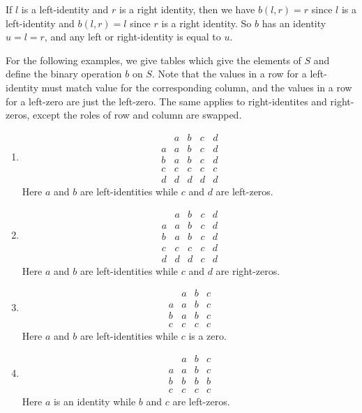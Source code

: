 \begin{solution}
If $l$ is a left-identity and $r$ is a right identity, then we have $b(l,r)=r$ since $l$ is a
left-identity and $b(l,r)=l$ since $r$ is a right identity. So $b$ has an identity $u=l=r$,
and any left or right-identity is equal to $u$.

For the following examples, we give tables which give the elements of $S$ and define
the binary operation $b$ on $S$. Note that the values in a row for a left-identity must match value
for the corresponding column, and the values in a row for a left-zero are just the left-zero.
The same applies to right-identites and right-zeros, except the roles of row and column are swapped.

\begin{enumerate}[label=(\alph*)]
    \item
    \[\begin{array}{c|cccc}
          & a & b & c & d\\
        \hline
        a & a & b & c & d\\
        b & a & b & c & d\\
        c & c & c & c & c\\
        d & d & d & d & d
    \end{array}\]
    Here $a$ and $b$ are left-identities while $c$ and $d$ are left-zeros.

    \item
    \[\begin{array}{c|cccc}
          & a & b & c & d\\
        \hline
        a & a & b & c & d\\
        b & a & b & c & d\\
        c & c & c & c & d\\
        d & d & d & c & d
    \end{array}\]
    Here $a$ and $b$ are left-identities while $c$ and $d$ are right-zeros.

    \item
    \[\begin{array}{c|ccc}
          & a & b & c\\
        \hline
        a & a & b & c\\
        b & a & b & c\\
        c & c & c & c
    \end{array}\]
    Here $a$ and $b$ are left-identities while $c$ is a zero.

    \item
    \[\begin{array}{c|ccc}
          & a & b & c\\
        \hline
        a & a & b & c\\
        b & b & b & b\\
        c & c & c & c
    \end{array}\]
    Here $a$ is an identity while $b$ and $c$ are left-zeros.


\end{enumerate}
\end{solution}
